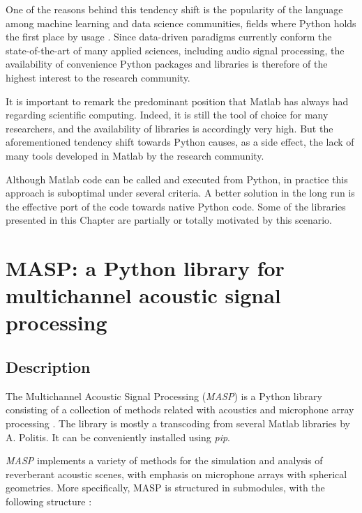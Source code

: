 One of the reasons behind this tendency shift is the popularity of the language among machine learning and data science communities, fields where Python holds the first place by usage \cite{githubblog}. 
Since data-driven paradigms currently conform the state-of-the-art of many applied sciences, including audio signal processing, the availability of convenience Python packages and libraries is therefore of the highest interest to the research community. 

It is important to remark the predominant position that Matlab has always had regarding scientific computing. Indeed, it is still the tool of choice for many researchers, and the availability of libraries is accordingly very high. 
But the aforementioned tendency shift towards Python causes, as a side effect, the lack of many tools developed in Matlab by the research community.

Although Matlab code can be called and executed from Python, in practice this approach is suboptimal under several criteria. A better solution in the long run is the effective port of the code towards native Python code. Some of the libraries presented in this Chapter are partially or totally  motivated by this scenario.

	

\section{MASP: a Python library for multichannel acoustic signal processing}
\label{sec:masp}
\subsection{Description}

The Multichannel Acoustic Signal Processing (\textit{MASP}) is a Python library consisting of a collection of methods related with acoustics and microphone array processing \cite{perez2020python}.
The library is mostly a transcoding from several Matlab libraries by A. Politis\cite{politis2016microphone, github_politis}. 
It can be conveniently installed using \textit{pip}.

\textit{MASP} implements a variety of methods for the simulation and analysis of reverberant acoustic scenes, with emphasis on microphone arrays with spherical geometries.
More specifically, MASP is structured in submodules, with the following structure :

